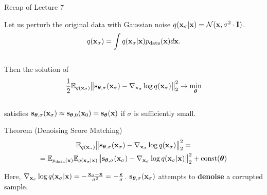 \documentclass{beamer}
\begin{document}
\begin{frame}
\titlepage
    \resetonslide
\end{frame}
\begin{frame}{Recap of Lecture 7}

    Let us perturb the original data with Gaussian noise $q(\mathbf{x}_{\sigma} | \mathbf{x}) = \mathcal{N}(\mathbf{x}, \sigma^2 \cdot \mathbf{I})$.
    \vspace{-0.3cm}
    \[
        q(\mathbf{x}_{\sigma}) = \int q(\mathbf{x}_{\sigma} | \mathbf{x}) p_{\text{data}}(\mathbf{x}) d\mathbf{x}.
    \]
    \vspace{-0.6cm} \\
    Then the solution of 
    \vspace{-0.2cm}
    \[
        \frac{1}{2} \mathbb{E}_{q(\mathbf{x}_{\sigma})}\bigl\| \mathbf{s}_{\boldsymbol{\theta}, \sigma}(\mathbf{x}_{\sigma}) - \nabla_{\mathbf{x}_{\sigma}} \log q(\mathbf{x}_{\sigma}) \bigr\|^2_2 \rightarrow \min_{\boldsymbol{\theta}}
    \]
    \vspace{-0.5cm} \\
    satisfies $\mathbf{s}_{\boldsymbol{\theta}, \sigma}(\mathbf{x}_{\sigma}) \approx \mathbf{s}_{\boldsymbol{\theta}, 0}(\mathbf{x}_0) = \mathbf{s}_{\boldsymbol{\theta}}(\mathbf{x})$ if $\sigma$ is sufficiently small.
    \begin{block}{Theorem (Denoising Score Matching)}
        \vspace{-0.8cm}
        \begin{multline*}
            \mathbb{E}_{q(\mathbf{x}_{\sigma})}\bigl\| \mathbf{s}_{\boldsymbol{\theta}, \sigma}(\mathbf{x}_{\sigma}) - \nabla_{\mathbf{x}_{\sigma}} \log q(\mathbf{x}_{\sigma}) \bigr\|^2_2 = \\ = \mathbb{E}_{p_{\text{data}}(\mathbf{x})} \mathbb{E}_{q(\mathbf{x}_{\sigma} | \mathbf{x})}\bigl\| \mathbf{s}_{\boldsymbol{\theta}, \sigma}(\mathbf{x}_{\sigma}) - \nabla_{\mathbf{x}_{\sigma}} \log q(\mathbf{x}_{\sigma} | \mathbf{x}) \bigr\|^2_2 + \text{const}(\boldsymbol{\theta})
        \end{multline*}
        \vspace{-0.7cm}
    \end{block}
    Here, $\nabla_{\mathbf{x}_{\sigma}} \log q(\mathbf{x}_{\sigma} | \mathbf{x}) = - \frac{\mathbf{x}_{\sigma} - \mathbf{x}}{\sigma^2} = - \frac{\boldsymbol{\epsilon}}{\sigma}$. $\mathbf{s}_{\boldsymbol{\theta}, \sigma}(\mathbf{x}_{\sigma})$ attempts to \textbf{denoise} a corrupted sample.
\end{frame}
\end{document}
